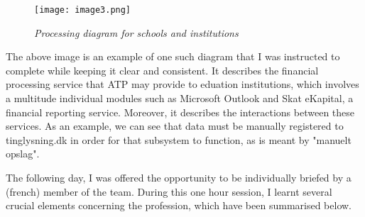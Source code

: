 \begin{figure}[H]
    \centering
        \texttt{[image: image3.png]}
        \caption*{\textit{Processing diagram for schools and institutions}}
\end{figure}

The above image is an example of one such diagram that I was instructed to complete while keeping it clear and consistent. It describes the financial processing service that ATP may provide to eduation institutions, which involves a multitude individual modules such as Microsoft Outlook and Skat eKapital, a financial reporting service. Moreover, it describes the interactions between these services. As an example, we can see that data must be manually registered to tinglysning.dk in order for that subsystem to function, as is meant by "manuelt opslag".

The following day, I was offered the opportunity to be individually briefed by a (french) member of the team. During this one hour session, I learnt several crucial elements concerning the profession, which have been summarised below.


